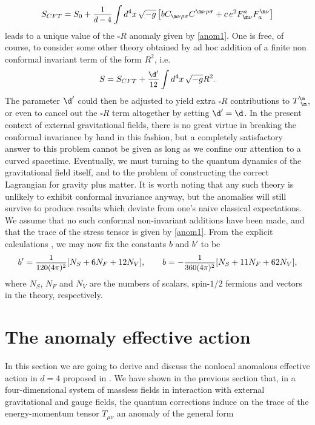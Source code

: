 \documentclass[a4paper,11pt,openright,twoside]{book}
\let\n=\nu      \let\x=\xi     \let\p=\pi      \let\r=\rho
\let\s=\sigma  \let\t=\tau     \let\u=\upsilon \let\f=\phi
\newcommand{\sdfrac}[2]{\mbox{\small$\displaystyle\frac{#1}{#2}$}}
\numberwithin{equation}{section}
\begin{document}
{{{\begin{equation}
		S_{CFT}=S_0+\sdfrac{1}{d-4}\int d^4x\,\sqrt{-g}\left[b C_{\m\n\r\s}C^{\m\n\r\s}+c\,e^2 F^a_{\m\n}F_a^{\m\n}\right]
	\end{equation}
	leads to a unique value of the $\square R$ anomaly given by \eqref{anom1}. One is free, of course, to consider some other theory obtained by ad hoc addition of a finite non conformal invariant term of the form $R^2$, i.e.
	\begin{equation}
		S=S_{CFT}+\sdfrac{\d'}{12}\int d^4x\,\sqrt{-g}R^2.
	\end{equation}
	The parameter $\d'$ could then be adjusted to yield extra $\square R$ contributions to $T^\m_{\ \m}$, or even to cancel out the $\square R$ term altogether by setting $\d'=\d$. In the present context of external gravitational fields, there is no great virtue in breaking the conformal invariance by hand in this fashion, but a completely satisfactory answer to this problem cannot be given as long as we confine our attention to a curved spacetime. Eventually, we must turning to the quantum dynamics of the gravitational field itself, and to the problem of constructing the correct Lagrangian for gravity plus matter. It is worth noting that any such theory is unlikely to exhibit conformal invariance anyway, but the anomalies will still survive to produce results which deviate from one's naive classical expectations. 
	We assume that no such conformal non-invariant additions have been made, and that the trace of the stress tensor is given by \eqref{anom1}. From the explicit calculations \cite{Duff:1993wm}, we may now fix the constants $b$ and $b'$ to be
	\begin{equation}
		b'=\sdfrac{1}{120(4\pi)^2}[N_S+6N_F+12N_V],\qquad b=-\sdfrac{1}{360(4\pi)^2}[N_S+11N_F+62N_V],
	\end{equation}
	where $N_S$, $N_F$ and $N_V$ are the numbers of scalars, spin-$1/2$ fermions and vectors in the theory, respectively. 
{\section{The anomaly effective action}
	In this section we are going to derive and discuss the nonlocal anomalous effective action in $d=4$ proposed in \cite{Riegert:1984kt}. We have shown in the previous section that, in a four-dimensional system of massless fields in interaction with external gravitational  and gauge fields, the quantum corrections induce on the trace of the energy-momentum tensor $T_{\mu\nu}$ an anomaly of the general form
}}}}
\end{document}
